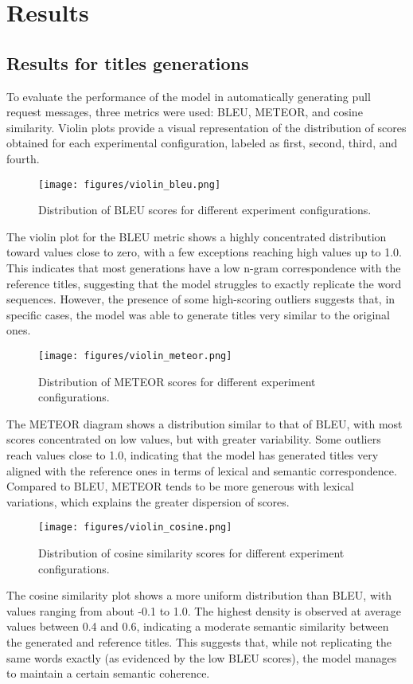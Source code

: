 \chapter{Results}\label{chap:results}
\section{Results for titles generations}
To evaluate the performance of the model in automatically generating pull request messages, three metrics were used: BLEU, METEOR, and cosine similarity. Violin plots provide a visual representation of the distribution of scores obtained for each experimental configuration, labeled as first, second, third, and fourth.
\begin{figure}[H] 
    \centering
        \texttt{[image: figures/violin\_bleu.png]}
        \caption{Distribution of BLEU scores for different experiment configurations.}
\end{figure}
The violin plot for the BLEU metric shows a highly concentrated distribution toward values close to zero, with a few exceptions reaching high values up to 1.0. This indicates that most generations have a low n-gram correspondence with the reference titles, suggesting that the model struggles to exactly replicate the word sequences. However, the presence of some high-scoring outliers suggests that, in specific cases, the model was able to generate titles very similar to the original ones.
\begin{figure}[H]
    \centering
        \texttt{[image: figures/violin\_meteor.png]}
        \caption{Distribution of METEOR scores for different experiment configurations.}
\end{figure}
The METEOR diagram shows a distribution similar to that of BLEU, with most scores concentrated on low values, but with greater variability. Some outliers reach values close to 1.0, indicating that the model has generated titles very aligned with the reference ones in terms of lexical and semantic correspondence. Compared to BLEU, METEOR tends to be more generous with lexical variations, which explains the greater dispersion of scores.
\begin{figure}[H] 
    \centering
        \texttt{[image: figures/violin\_cosine.png]}
        \caption{Distribution of cosine similarity scores for different experiment configurations.}
\end{figure}
The cosine similarity plot shows a more uniform distribution than BLEU, with values ranging from about -0.1 to 1.0. The highest density is observed at average values between 0.4 and 0.6, indicating a moderate semantic similarity between the generated and reference titles. This suggests that, while not replicating the same words exactly (as evidenced by the low BLEU scores), the model manages to maintain a certain semantic coherence.
